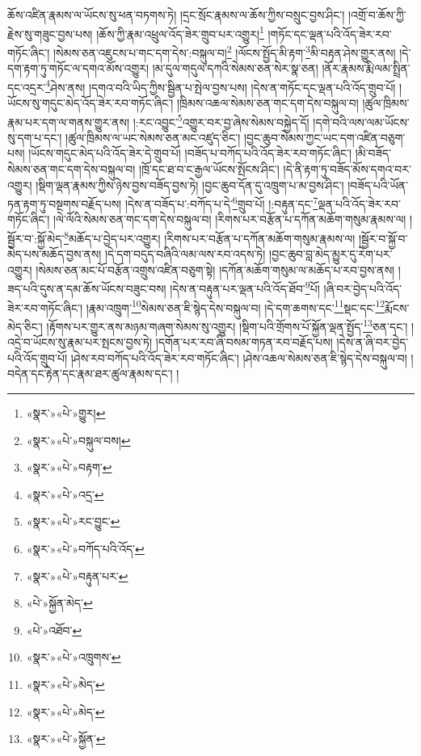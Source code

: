 ཆོས་འཛིན་རྣམས་ལ་ཡོངས་སུ་ཕན་བཏགས་ཏེ། །དྲང་སྲོང་རྣམས་ལ་ཆོས་ཀྱིས་བསྲུང་བྱས་ཤིང་། །འགྲོ་བ་ཆོས་ཀྱི་རྗེས་སུ་གཟུང་བྱས་པས། །ཆོས་ཀྱི་རྣམ་འཕྲུལ་འོད་ཟེར་གྲུབ་པར་འགྱུར།\footnote{«སྣར་»«པེ་»གྱུར།} །གཏོང་དང་ལྡན་པའི་འོད་ཟེར་རབ་གཏོང་ཞིང་། །སེམས་ཅན་འཇུངས་པ་གང་དག་དེས་:བསྐུལ་བ།\footnote{«སྣར་»«པེ་»བསྐུལ་བས།} །ལོངས་སྤྱོད་མི་རྟག་\footnote{«སྣར་»«པེ་»བརྟག་}མི་བརྟན་ཤེས་གྱུར་ནས། །དེ་དག་རྟག་ཏུ་གཏོང་ལ་དགའ་མོས་འགྱུར། །མ་དུལ་གདུལ་དཀའི་སེམས་ཅན་སེར་སྣ་ཅན། །ནོར་རྣམས་རྨི་ལམ་སྤྲིན་དང་འདྲར་\footnote{«སྣར་»«པེ་»འདྲ་}ཤེས་ནས། །དགའ་བའི་ཡིད་ཀྱིས་སྦྱིན་པ་སྤེལ་བྱས་པས། །དེས་ན་གཏོང་དང་ལྡན་པའི་འོད་གྲུབ་པོ། །ཡོངས་སུ་གདུང་མེད་འོད་ཟེར་རབ་གཏོང་ཞིང་། །ཁྲིམས་འཆལ་སེམས་ཅན་གང་དག་དེས་བསྐུལ་བ། །ཚུལ་ཁྲིམས་རྣམ་པར་དག་ལ་གནས་གྱུར་ནས། །:རང་འབྱུང་\footnote{«སྣར་»«པེ་»རང་བྱུང་}འགྱུར་བར་བྱ་ཞེས་སེམས་བསྐྱེད་དོ། །དགེ་བའི་ལས་ལམ་ཡོངས་སུ་དག་པ་དང་། །ཚུལ་ཁྲིམས་ལ་ཡང་སེམས་ཅན་མང་འཛུད་ཅིང་། །བྱང་ཆུབ་སེམས་ཀྱང་ཡང་དག་འཛིན་བཅུག་པས། །ཡོངས་གདུང་མེད་པའི་འོད་ཟེར་དེ་གྲུབ་པོ། །བཟོད་པ་བཀོད་པའི་འོད་ཟེར་རབ་གཏོང་ཞིང་། །མི་བཟོད་སེམས་ཅན་གང་དག་དེས་བསྐུལ་བ། །ཁྲོ་དང་ཐ་བ་ང་རྒྱལ་ཡོངས་སྤོངས་ཤིང་། །དེ་ནི་རྟག་ཏུ་བཟོད་མོས་དགའ་བར་འགྱུར། །སྡིག་ལྡན་རྣམས་ཀྱིས་ཉེས་བྱས་བཟོད་བྱས་ཏེ། །བྱང་ཆུབ་དོན་དུ་འཁྲུག་པ་མ་བྱས་ཤིང་། །བཟོད་པའི་ཡོན་ཏན་རྟག་ཏུ་བསྔགས་བརྗོད་པས། །དེས་ན་བཟོད་པ་:བཀོད་པ་དེ་\footnote{«སྣར་»«པེ་»བཀོད་པའི་འོད་}གྲུབ་པོ། །:བརྟུན་དང་\footnote{«སྣར་»«པེ་»བརྟུན་པར་}ལྡན་པའི་འོད་ཟེར་རབ་གཏོང་ཞིང་། །ལེ་ལོའི་སེམས་ཅན་གང་དག་དེས་བསྐུལ་བ། །རིགས་པར་བརྩོན་པ་དཀོན་མཆོག་གསུམ་རྣམས་ལ། །སྦྱོར་བ་:སྐྱོ་མེད་\footnote{«པེ་»སྐྱོན་མེད་}མཆོད་པ་བྱེད་པར་འགྱུར། །རིགས་པར་བརྩོན་པ་དཀོན་མཆོག་གསུམ་རྣམས་ལ། །སྦྱོར་བ་སྐྱོ་བ་མེད་པས་མཆོད་བྱས་ནས། །དེ་དག་བདུད་བཞིའི་ལམ་ལས་རབ་འདས་ཏེ། །བྱང་ཆུབ་བླ་མེད་མྱུར་དུ་རེག་པར་འགྱུར། །སེམས་ཅན་མང་པོ་བརྩོན་འགྲུས་འཛིན་བཅུག་སྟེ། །དཀོན་མཆོག་གསུམ་ལ་མཆོད་པ་རབ་བྱས་ནས། །ཟད་པའི་དུས་ན་དམ་ཆོས་ཡོངས་བཟུང་བས། །དེས་ན་བརྟུན་པར་ལྡན་པའི་འོད་ཐོབ་\footnote{«པེ་»འཐོབ་}པོ། །ཞི་བར་བྱེད་པའི་འོད་ཟེར་རབ་གཏོང་ཞིང་། །རྣམ་འཁྲུག་\footnote{«སྣར་»«པེ་»འཁྲུགས་}སེམས་ཅན་ཇི་སྙེད་དེས་བསྐུལ་བ། །དེ་དག་ཆགས་དང་\footnote{«སྣར་»«པེ་»མེད་}སྡང་དང་\footnote{«སྣར་»«པེ་»མེད་}རྨོངས་མེད་ཅིང་། །རྟོགས་པར་གྱུར་ནས་མཉམ་གཞག་སེམས་སུ་འགྱུར། །སྡིག་པའི་གྲོགས་པོ་སྐྱོན་ལྡན་སྤྱོད་\footnote{«སྣར་»«པེ་»སྐྱོན་}ཅན་དང་། །འདྲེ་བ་ཡོངས་སུ་རྣམ་པར་སྤངས་བྱས་ཏེ། །དགོན་པར་རབ་ཞི་བསམ་གཏན་རབ་བརྗོད་པས། །དེས་ན་ཞི་བར་བྱེད་པའི་འོད་གྲུབ་པོ། །ཤེས་རབ་བཀོད་པའི་འོད་ཟེར་རབ་གཏོང་ཞིང་། །ཤེས་འཆལ་སེམས་ཅན་ཇི་སྙེད་དེས་བསྐུལ་བ། །བདེན་དང་རྟེན་དང་རྣམ་ཐར་ཚུལ་རྣམས་དང་། །
